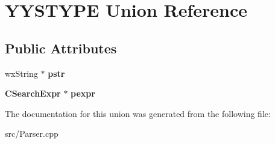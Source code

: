 \section{YYSTYPE Union Reference}
\label{unionYYSTYPE}
\subsection*{Public Attributes}
\begin{DoxyCompactItemize}
\item 
wxString $\ast$ {\bfseries pstr}\label{unionYYSTYPE_ad441294015e76360afd956fdf14f5d68}

\item 
{\bf CSearchExpr} $\ast$ {\bfseries pexpr}\label{unionYYSTYPE_a53a6a3c5a6ddfb8d2d22cc3579de5a9f}

\end{DoxyCompactItemize}


The documentation for this union was generated from the following file:\begin{DoxyCompactItemize}
\item 
src/Parser.cpp\end{DoxyCompactItemize}
